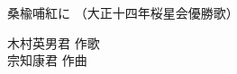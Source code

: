 \documentclass[10pt,b5j]{tarticle} %
\begin{document}
\begin{minipage}[c]{0.7\hsize} %
    \begin{center}
        {\LARGE
            桑楡哺紅に %
        }
        {\small 
            （大正十四年桜星会優勝歌） %
        }
    \end{center}
\end{minipage}
\begin{minipage}[c]{0.3\hsize} %
    \begin{flushright} %
        木村英男君 作歌\\宗知康君 作曲 %
    \end{flushright}
\end{minipage}
\end{document}
